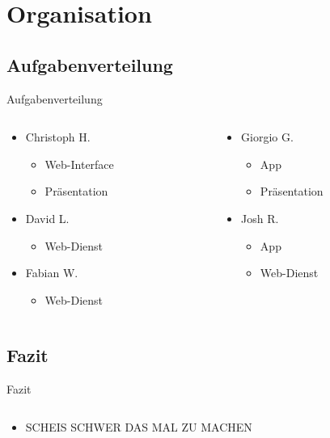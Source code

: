 \documentclass[19pt]{beamer}
\begin{document}
\section{Organisation}

\subsection{Aufgabenverteilung}
\begin{frame}{Aufgabenverteilung}
  \begin{columns}[T]
    \begin{column}{.5\textwidth}
    		\begin{itemize}
    	\item Christoph H.
			\begin{itemize}
				\item Web-Interface
				\item Präsentation
			\end{itemize}
		\item David L.
			\begin{itemize}
				\item Web-Dienst
			\end{itemize}
		\item Fabian W.
			\begin{itemize}
				\item Web-Dienst
			\end{itemize}
    		\end{itemize}
    \end{column}
    \begin{column}{.5\textwidth}
    \begin{itemize}
		\item Giorgio G.
			\begin{itemize}
				\item App
				\item Präsentation
			\end{itemize}
		\item Josh R.
			\begin{itemize}
				\item App
				\item Web-Dienst
			\end{itemize}
	\end{itemize}
    \end{column}
  \end{columns}
\end{frame}

\subsection{Fazit}
\begin{frame}{Fazit}
   \begin{columns}[T]
    \begin{column}{.5\textwidth}
    		\begin{itemize}
    		\item SCHEIS SCHWER DAS MAL ZU MACHEN
    		\end{itemize}
    \end{column}
   \end{columns}
\end{frame}
\end{document}
